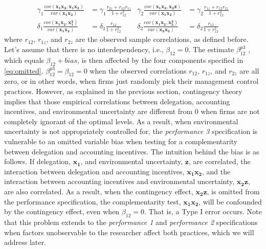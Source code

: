 \documentclass[12pt]{article}
\begin{document}
\begin{equation}\label{eq:omitted}
\begin{aligned}
\gamma_1 \frac{cov(\mathbf{x_1 x_2}, \mathbf{x_1 x_2})}{var(\mathbf{x_1 x_2})} &= 
\gamma_1 \frac{r_{2z} + r_{12} r_{1z}}{1 + r_{12}^2}
&\gamma_2 \frac{cov(\mathbf{x_1 x_2}, \mathbf{x_2 z})}{var(\mathbf{x_1 x_2})} &= 
\gamma_2 \frac{r_{1z} + r_{12} r_{2z}}{1 + r_{12}^2}
\\
\delta_1 \frac{cov(\mathbf{x_1 x_2}, \mathbf{x_1^2})}{var(\mathbf{x_1 x_2})} &= 
\delta_1 \frac{r_{12}}{1 + r_{12}^2}
&\delta_2 \frac{cov(\mathbf{x_1 x_2}, \mathbf{x_2^2})}{var(\mathbf{x_2 x_2})} &= 
\delta_2 \frac{r_{12}}{1 + r_{12}^2}
\end{aligned}
\end{equation}
where $r_{12}$, $r_{1z}$, and $r_{2z}$ are the observed sample correlations, as defined before. Let's assume that there is no interdependency, i.e., $\beta_{12}=0$. The estimate $\beta^{p3}_{12}$ , which equals $\beta_{12} + bias$, is then affected by the four components specified in \eqref{eq:omitted}. $\beta^{p3}_{12}=\beta_{12}=0$ when the observed correlations $r_{12}$, $r_{1z}$, and $r_{2z}$ are all zero, or in other words, when firms just randomly pick their management control practices. However, as explained in the previous section, contingency theory implies that those empirical correlations between delegation, accounting incentives, and environmental uncertainty are different from $0$ when firms are not completely ignorant of the optimal levels. As a result, when environmental uncertainty is not appropriately controlled for, the \emph{performance 3} specification is vulnerable to an omitted variable bias when testing for a complementarity between delegation and accounting incentives. The intuition behind the bias is as follows. If delegation, $\mathbf{x_1}$, and environmental uncertainty, $\mathbf{z}$, are correlated, the interaction between delegation and accounting incentives, $\mathbf{x_1 x_2}$, and the interaction between accounting incentives and environmental uncertainty, $\mathbf{x_2 z}$, are also correlated. As a result, when the contingency effect, $\mathbf{x_2 z}$, is omitted from the performance specification, the complementarity test, $\mathbf{x_1 x_2}$, will be confounded by the contingency effect, even when $\beta_{12}=0$. That is, a Type I error occurs. Note that this problem extends to the \emph{performance 1} and \emph{performance 2} specifications when factors unobservable to the researcher affect both practices, which we will address later.
\end{document}
